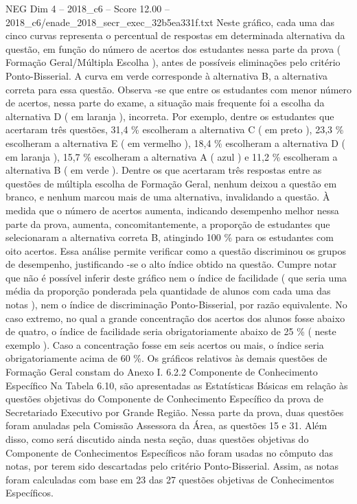 \begin{textsample}{NEG Dim 4 – 2018\_c6 – Score 12.00 – 2018\_c6/enade\_2018\_secr\_exec\_32b5ea331f.txt}
Neste gráfico, cada uma das cinco curvas representa o percentual de respostas em determinada alternativa da questão, em função do número de acertos dos estudantes nessa parte da prova ( Formação Geral/Múltipla Escolha ), antes de possíveis eliminações pelo critério Ponto-Bisserial.
A curva em verde corresponde à alternativa B, a alternativa correta para essa questão.
Observa -se que entre os estudantes com menor número de acertos, nessa parte do exame, a situação mais frequente foi a escolha da alternativa D ( em laranja ), incorreta.
Por exemplo, dentre os estudantes que acertaram três questões, 31,4 \% escolheram a alternativa C ( em preto ), 23,3 \% escolheram a alternativa E ( em vermelho ), 18,4 \% escolheram a alternativa D ( em laranja ), 15,7 \% escolheram a alternativa A ( azul ) e 11,2 \% escolheram a alternativa B ( em verde ).
Dentre os que acertaram três respostas entre as questões de múltipla escolha de Formação Geral, nenhum deixou a questão em branco, e nenhum marcou mais de uma alternativa, invalidando a questão.
À medida que o número de acertos aumenta, indicando desempenho melhor nessa parte da prova, aumenta, concomitantemente, a proporção de estudantes que selecionaram a alternativa correta B, atingindo 100 \% para os estudantes com oito acertos.
Essa análise permite verificar como a questão discriminou os grupos de desempenho, justificando -se o alto índice obtido na questão.
Cumpre notar que não é possível inferir deste gráfico nem o índice de facilidade ( que seria uma média da proporção ponderada pela quantidade de alunos com cada uma das notas ), nem o índice de discriminação Ponto-Bisserial, por razão equivalente.
No caso extremo, no qual a grande concentração dos acertos dos alunos fosse abaixo de quatro, o índice de facilidade seria obrigatoriamente abaixo de 25 \% ( neste exemplo ).
Caso a concentração fosse em seis acertos ou mais, o índice seria obrigatoriamente acima de 60 \%.
Os gráficos relativos às demais questões de Formação Geral constam do Anexo I. 6.2.2 Componente de Conhecimento Específico Na Tabela 6.10, são apresentadas as Estatísticas Básicas em relação às questões objetivas do Componente de Conhecimento Específico da prova de Secretariado Executivo por Grande Região.
Nessa parte da prova, duas questões foram anuladas pela Comissão Assessora da Área, as questões 15 e 31.
Além disso, como será discutido ainda nesta seção, duas questões objetivas do Componente de Conhecimentos Específicos não foram usadas no cômputo das notas, por terem sido descartadas pelo critério Ponto-Bisserial.
Assim, as notas foram calculadas com base em 23 das 27 questões objetivas de Conhecimentos Específicos.

\end{textsample}
